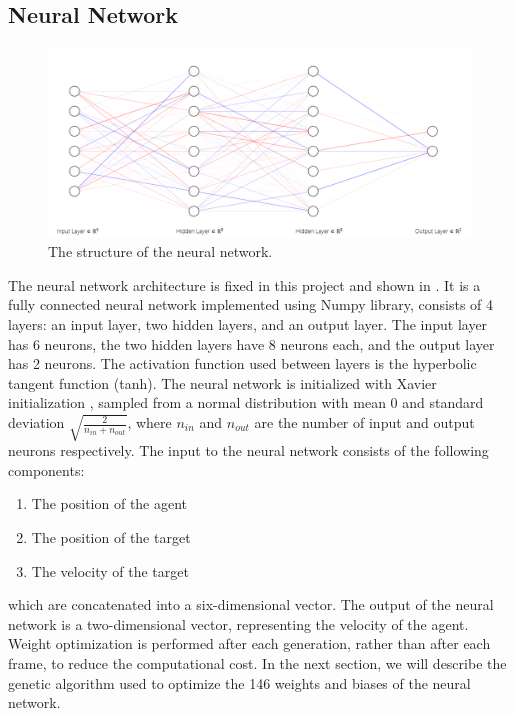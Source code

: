 \documentclass[sigconf]{acmart}
\begin{document}
\subsection{Neural Network}
\begin{figure}[H]
  \centering
  \includegraphics[width=0.8\linewidth]{imgs/NeuralNetwork.png}
  \caption{The structure of the neural network.}
  \label{fig:neural_network}
\end{figure}
The neural network architecture is fixed in this project and shown in . It is a fully connected neural network implemented using Numpy library, consists of 4 layers: an input layer, two hidden layers, and an output layer. The input layer has 6 neurons, the two hidden layers have 8 neurons each, and the output layer has 2 neurons. The activation function used between layers is the hyperbolic tangent function (tanh). The neural network is initialized with Xavier initialization \label{imp_Initialization}\cite{Xavier_pmlr-v9-glorot10a}, sampled from a normal distribution with mean 0 and standard deviation $\sqrt{\frac{2}{n_{in} + n_{out}}}$, where $n_{in}$ and $n_{out}$ are the number of input and output neurons respectively. The input to the neural network consists of the following components:
\begin{enumerate}
  \item The position of the agent
  \item The position of the target
  \item The velocity of the target
\end{enumerate}
which are concatenated into a six-dimensional vector.
The output of the neural network is a two-dimensional vector, representing the velocity of the agent. 
Weight optimization is performed after each generation, rather than after each frame, to reduce the computational cost.
In the next section, we will describe the genetic algorithm used to optimize the 146 weights and biases of the neural network.
\end{document}
